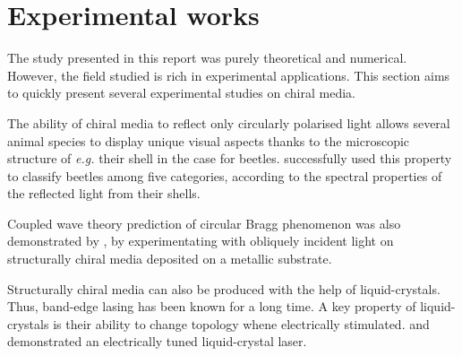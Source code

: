 \section{Experimental works}
\label{sec:experimental_work}

The study presented in this report was purely theoretical and numerical. However, the field studied is rich in experimental applications. This section aims to quickly present several experimental studies on chiral media.

The ability of chiral media to reflect only circularly polarised light allows several animal species to display unique visual aspects thanks to the microscopic structure of \textit{e.g.} their shell in the case for beetles. \Textcite{erten_experimental_2015} successfully used this property to classify beetles among five categories, according to the spectral properties of the reflected light from their shells.

Coupled wave theory prediction of circular Bragg phenomenon was also demonstrated by \textcite{carter_variation_2016}, by experimentating with obliquely incident light on structurally chiral media deposited on a metallic substrate.

Structurally chiral media can also be produced with the help of liquid-crystals. Thus, band-edge lasing has been known for a long time\cite{barna_band_2005}. A key property of liquid-crystals is their ability to change topology whene electrically stimulated. \Textcite{maune_liquid-crystal_2004} and \cite{xiang_electrically_2016} demonstrated an electrically tuned liquid-crystal laser.